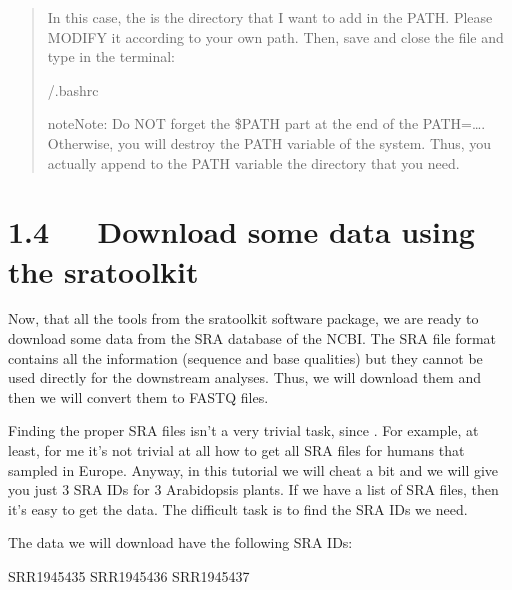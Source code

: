 \documentclass[letterpaper,10pt,english]{sphinxmanual}
\begin{document}
\begin{quote}
\begin{enumerate}
\sphinxAtStartPar
In this case, the  is the directory that I want to add in the PATH. Please MODIFY it according to your own path. Then, save and close the file and type in the terminal:

\begin{sphinxVerbatim}[commandchars=\\\{\}]
 \PYGZti{}/.bashrc  
\end{sphinxVerbatim}

\begin{sphinxadmonition}{note}{Note:}
\sphinxAtStartPar
Do NOT forget the \$PATH part at the end of the PATH=…. Otherwise, you will destroy the PATH variable of the system. Thus, you actually append to the PATH variable the directory that you need.
\end{sphinxadmonition}

\end{enumerate}
\end{quote}


\chapter{1.4   Download some data using the sra\sphinxhyphen{}toolkit}
\label{\detokenize{index:download-some-data-using-the-sra-toolkit}}
\sphinxAtStartPar
Now, that all the tools from the sra\sphinxhyphen{}toolkit software package, we are ready to download some data from the SRA database of the NCBI. The SRA file format contains all the information (sequence and base qualities) but they cannot be used directly for the downstream analyses. Thus, we will download them and then we will convert them to FASTQ files.

\sphinxAtStartPar
Finding the proper SRA files isn’t a very trivial task, since . For example, at least, for me it’s not trivial at all how to get all SRA files for humans that sampled in Europe. Anyway, in this tutorial we will cheat a bit and we will give you just 3 SRA IDs for 3 Arabidopsis plants. If we have a list of SRA files, then it’s easy to get the data. The difficult task is to find the SRA IDs we need.

\sphinxAtStartPar
The data we will download have the following SRA IDs:

\begin{sphinxVerbatim}[commandchars=\\\{\}]
SRR1945435
SRR1945436
SRR1945437
\end{sphinxVerbatim}
\end{document}

